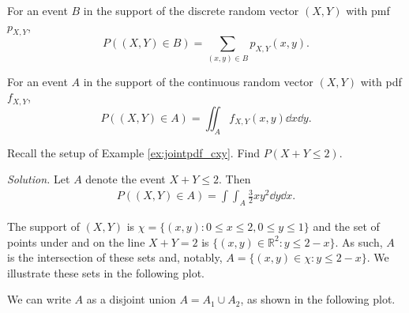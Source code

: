 For an event $B$ in the support of the discrete random vector $(X,Y)$ with pmf $p_{X,Y}$,
$$P((X,Y)\in B)=\sum_{(x,y)\in B}p_{X,Y}(x,y).$$

For an event $A$ in the support of the continuous random vector $(X,Y)$ with pdf $f_{X,Y}$,
$$P((X,Y)\in A)=\iint_Af_{X,Y}(x,y)\dd x\dd y.$$

\begin{example}[]
	Recall the setup of Example \ref{ex:jointpdf_cxy}. Find $P(X+Y\leq 2)$.

	\textit{Solution.} Let $A$ denote the event $X+Y\leq 2$. Then
	\begin{align*}
		P((X,Y)\in A)=\int\int_A\frac 32xy^2\dd y\dd x.
	\end{align*}


	The support of $(X,Y)$ is $\chi=\{(x,y):0\leq x\leq 2,0\leq y\leq 1\}$ and the set of points under and on the line $X+Y=2$ is $\{(x,y)\in\mathbb R^2:y\leq 2-x\}$. As such, $A$ is the intersection of these sets and, notably, $A=\{(x,y)\in\chi:y\leq 2-x\}$. We illustrate these sets in the following plot.

	\begin{center}
	\end{center}
	We can write $A$ as a disjoint union $A=A_1\cup A_2$, as shown in the following plot.

	\begin{center}
\end{center}
\end{example}
